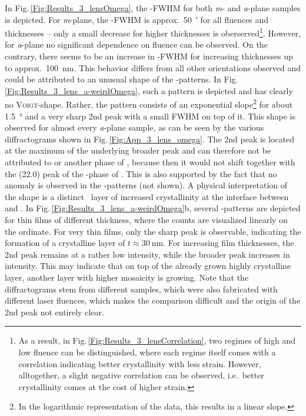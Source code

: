 In Fig.\,\ref{Fig:Results_3_lensOmega}, the \textomega-FWHM for both \textit{m}- and \textit{a}-plane samples is depicted.
For \textit{m}-plane, the \textomega-FWHM is approx.\ \qty{50}{\arcminute} for all fluences and thicknesses -- only a small decrease for higher thicknesses is oberserved\footnote{
    As a result, in Fig.\,\ref{Fig:Results_3_lensCorrelation}, two regimes of high and low fluence can be distinguished, where each regime itself comes with a correlation indicating better crystallinity with less strain.
    However, alltogether, a slight negative correlation can be observed, i.e.\ better crystallinity comes at the cost of higher strain.
}.
However, for \textit{a}-plane no significant dependence on fluence can be observed.
On the contrary, there seems to be an increase in \textomega-FWHM for increasing thicknesses up to approx.\ \qty{100}{\nm}.
This behavior differs from all other orientations observed and could be attributed to an unusual shape of the \textomega-patterns.
In Fig.\,\ref{Fig:Results_3_lens_a-weirdOmega}, such a pattern is depicted and has clearly no \textsc{Voigt}-shape.
Rather, the pattern consists of an exponential slope\footnote{
    In the logarithmic representation of the data, this results in a linear slope.
}
for about \qty{1.5}{\degree} and a very sharp 2nd peak with a small \gls{FWHM} on top of it.
This shape is observed for almost every \textit{a}-plane sample, as can be seen by the various diffractograms shown in Fig.\,\ref{Fig:App_3_lens_omega}.
The 2nd peak is located at the maximum of the underlying broader peak and can therefore not be attributed to  or another phase of \cro, because then it would not shift together with the (22.0) peak of the \textalpha-phase of \cro.
This is also supported by the fact that no anomaly is observed in the \thetaomega-patterns (not shown).
A physical interpretation of the shape is a distinct \cro\ layer of increased crystallinity at the interface between  and \cro.
In Fig.\,\ref{Fig:Results_3_lens_a-weirdOmega}b, several \textomega-patterns are depicted for thin films of different thickness, where the counts are visualized linearly on the ordinate.
For very thin films, only the sharp peak is observable, indicating the formation of a crystalline layer of $t\approx\qty{30}{\nm}$.
For increasing film thicknesses, the 2nd peak remains at a rather low intensity, while the broader peak increases in intensity.
This may indicate that on top of the already grown highly crystalline layer, another layer with higher mosaicity is growing.
Note that the diffractograms stem from different samples, which were also fabricated with different laser fluences, which makes the comparison difficult and the origin of the 2nd peak not entirely clear.
